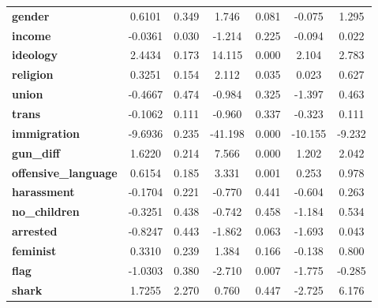 \begin{center}
\begin{tabular}{lcccccc}
\textbf{gender}                 &       0.6101  &        0.349     &     1.746  &         0.081        &       -0.075    &        1.295     \\
\textbf{income}                 &      -0.0361  &        0.030     &    -1.214  &         0.225        &       -0.094    &        0.022     \\
\textbf{ideology}               &       2.4434  &        0.173     &    14.115  &         0.000        &        2.104    &        2.783     \\
\textbf{religion}               &       0.3251  &        0.154     &     2.112  &         0.035        &        0.023    &        0.627     \\
\textbf{union}                  &      -0.4667  &        0.474     &    -0.984  &         0.325        &       -1.397    &        0.463     \\
\textbf{trans}                  &      -0.1062  &        0.111     &    -0.960  &         0.337        &       -0.323    &        0.111     \\
\textbf{immigration}            &      -9.6936  &        0.235     &   -41.198  &         0.000        &      -10.155    &       -9.232     \\
\textbf{gun\_diff}              &       1.6220  &        0.214     &     7.566  &         0.000        &        1.202    &        2.042     \\
\textbf{offensive\_language}    &       0.6154  &        0.185     &     3.331  &         0.001        &        0.253    &        0.978     \\
\textbf{harassment}             &      -0.1704  &        0.221     &    -0.770  &         0.441        &       -0.604    &        0.263     \\
\textbf{no\_children}           &      -0.3251  &        0.438     &    -0.742  &         0.458        &       -1.184    &        0.534     \\
\textbf{arrested}               &      -0.8247  &        0.443     &    -1.862  &         0.063        &       -1.693    &        0.043     \\
\textbf{feminist}               &       0.3310  &        0.239     &     1.384  &         0.166        &       -0.138    &        0.800     \\
\textbf{flag}                   &      -1.0303  &        0.380     &    -2.710  &         0.007        &       -1.775    &       -0.285     \\
\textbf{shark}                  &       1.7255  &        2.270     &     0.760  &         0.447        &       -2.725    &        6.176     \\

\end{tabular}
\end{center}
